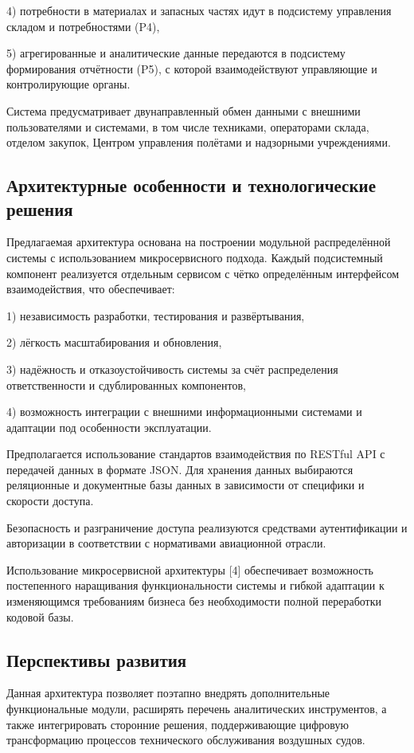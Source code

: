\documentclass[14pt,a4paper]{extarticle}
\begin{document}
4) потребности в материалах и запасных частях идут в подсистему управления складом и потребностями (P4),

5) агрегированные и аналитические данные передаются в подсистему формирования отчётности (P5), с которой взаимодействуют управляющие и контролирующие органы.

Система предусматривает двунаправленный обмен данными с внешними пользователями и системами, в том числе техниками, операторами склада, отделом закупок, Центром управления полётами и надзорными учреждениями.

\subsection{Архитектурные особенности и технологические решения}

Предлагаемая архитектура основана на построении модульной распределённой системы с использованием микросервисного подхода. Каждый подсистемный компонент реализуется отдельным сервисом с чётко определённым интерфейсом взаимодействия, что обеспечивает:

1) независимость разработки, тестирования и развёртывания,

2) лёгкость масштабирования и обновления,

3) надёжность и отказоустойчивость системы за счёт распределения ответственности и сдублированных компонентов,

4) возможность интеграции с внешними информационными системами и адаптации под особенности эксплуатации.

Предполагается использование стандартов взаимодействия по RESTful API с передачей данных в формате JSON. Для хранения данных выбираются реляционные и документные базы данных в зависимости от специфики и скорости доступа.

Безопасность и разграничение доступа реализуются средствами аутентификации и авторизации в соответствии с нормативами авиационной отрасли.

Использование микросервисной архитектуры [4] обеспечивает возможность постепенного наращивания функциональности системы и гибкой адаптации к изменяющимся требованиям бизнеса без необходимости полной переработки кодовой базы.

\subsection{Перспективы развития}

Данная архитектура позволяет поэтапно внедрять дополнительные функциональные модули, расширять перечень аналитических инструментов, а также интегрировать сторонние решения, поддерживающие цифровую трансформацию процессов технического обслуживания воздушных судов.
\end{document}
